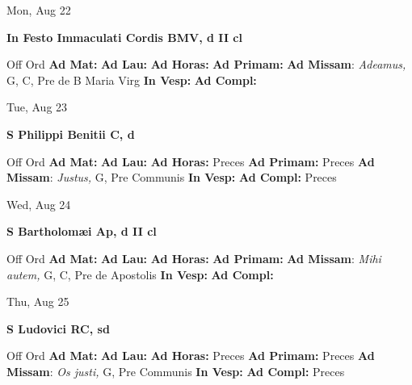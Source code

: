 \documentclass[10pt]{article}
\begin{document}
\begin{minipage}{3.5in}
\vspace{2em}\begin{center}
Mon, Aug 22
\end{center}\textbf{ \large In Festo Immaculati Cordis BMV, \textnormal{\normalsize d II cl}}
\begin{justify}
Off Ord
\textbf{Ad Mat: }
\textbf{Ad Lau: }
\textbf{Ad Horas: }
\textbf{Ad Primam: }
\textbf{Ad Missam}: \textit{Adeamus,} G, C, Pre de B Maria Virg
\textbf{In Vesp: }
\textbf{Ad Compl: }\end{justify}
\end{minipage}



\begin{minipage}{3.5in}
\vspace{2em}\begin{center}
Tue, Aug 23
\end{center}\textbf{ \large S Philippi Benitii C, \textnormal{\normalsize d}}
\begin{justify}
Off Ord
\textbf{Ad Mat: }
\textbf{Ad Lau: }
\textbf{Ad Horas: }Preces
\textbf{Ad Primam: }Preces
\textbf{Ad Missam}: \textit{Justus,} G, Pre Communis
\textbf{In Vesp: }
\textbf{Ad Compl: }Preces\end{justify}
\end{minipage}



\begin{minipage}{3.5in}
\vspace{2em}\begin{center}
Wed, Aug 24
\end{center}\textbf{ \large S Bartholomæi Ap, \textnormal{\normalsize d II cl}}
\begin{justify}
Off Ord
\textbf{Ad Mat: }
\textbf{Ad Lau: }
\textbf{Ad Horas: }
\textbf{Ad Primam: }
\textbf{Ad Missam}: \textit{Mihi autem,} G, C, Pre de Apostolis
\textbf{In Vesp: }
\textbf{Ad Compl: }\end{justify}
\end{minipage}



\begin{minipage}{3.5in}
\vspace{2em}\begin{center}
Thu, Aug 25
\end{center}\textbf{ \large S Ludovici RC, \textnormal{\normalsize sd}}
\begin{justify}
Off Ord
\textbf{Ad Mat: }
\textbf{Ad Lau: }
\textbf{Ad Horas: }Preces
\textbf{Ad Primam: }Preces
\textbf{Ad Missam}: \textit{Os justi,} G, Pre Communis
\textbf{In Vesp: }
\textbf{Ad Compl: }Preces\end{justify}
\end{minipage}
\end{document}
